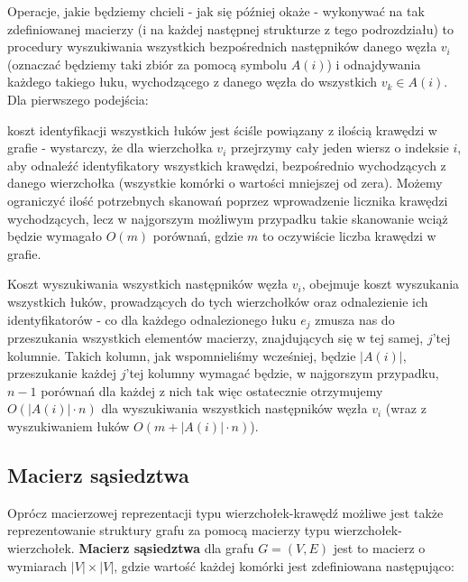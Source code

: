 Operacje, jakie będziemy chcieli - jak się później okaże - wykonywać na tak zdefiniowanej macierzy (i na każdej następnej strukturze z tego podrozdziału) to procedury wyszukiwania wszystkich bezpośrednich następników danego węzła $v_{i}$ (oznaczać będziemy taki zbiór za pomocą symbolu $A \left( i \right) $) i odnajdywania każdego takiego łuku, wychodzącego z danego węzła do wszystkich $v_{k} \in A \left( i \right) $. Dla pierwszego podejścia:

\begin{myitemize}
	\item koszt identyfikacji wszystkich łuków jest ściśle powiązany z ilością krawędzi w grafie - wystarczy, że dla wierzchołka $v_{i}$ przejrzymy cały jeden wiersz o indeksie $i$, aby odnaleźć identyfikatory wszystkich krawędzi, bezpośrednio wychodzących z danego wierzchołka (wszystkie komórki o wartości mniejszej od zera). Możemy ograniczyć ilość potrzebnych skanowań poprzez wprowadzenie licznika krawędzi wychodzących, lecz w najgorszym możliwym przypadku takie skanowanie wciąż będzie wymagało $O \left( m \right)$ porównań, gdzie $m$ to oczywiście liczba krawędzi w grafie.
	\item Koszt wyszukiwania wszystkich następników węzła $v_{i}$, obejmuje koszt wyszukania wszystkich łuków, prowadzących do tych wierzchołków oraz odnalezienie ich identyfikatorów - co dla każdego odnalezionego łuku $e_{j}$ zmusza nas do przeszukania wszystkich elementów macierzy, znajdujących się w tej samej, $j$'tej kolumnie. Takich kolumn, jak wspomnieliśmy wcześniej, będzie $ \left| A \left( i \right) \right| $, przeszukanie każdej $j$'tej kolumny wymagać będzie, w najgorszym przypadku, $n-1$ porównań dla każdej z nich tak więc ostatecznie otrzymujemy $O \left( \left| A \left( i \right) \right| \cdot n \right)$ dla wyszukiwania wszystkich następników węzła $v_{i}$ (wraz z wyszukiwaniem łuków $O \left( m + \left| A \left( i \right) \right| \cdot n \right)$).
\end{myitemize}

\subsection{Macierz sąsiedztwa}

Oprócz macierzowej reprezentacji typu wierzchołek-krawędź możliwe jest także reprezentowanie struktury grafu za pomocą macierzy typu wierzchołek-wierzchołek. \textbf{Macierz sąsiedztwa} dla grafu $G = \left( V, E \right) $ jest to macierz o wymiarach $\left| V \right| \times \left| V \right|$, gdzie wartość każdej komórki jest zdefiniowana następująco:

